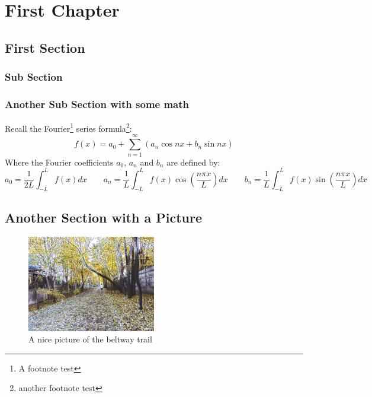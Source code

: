 \documentclass[11pt,letterpaper,twoside]{book}
\begin{document}
\tableofcontents

\chapter{First Chapter}

\lipsum[1-2]

\section{First Section}

\lipsum[3-5]

\subsection{Sub Section}

\lipsum[7-9]

\subsection{Another Sub Section with some math}

\lipsum[6-8]
Recall the Fourier\footnote{A footnote test} series formula\footnote{another footnote test \lipsum[1]}:
\[
f(x) = a_0 + \sum_{n = 1}^\infty \left( a_n \cos nx + b_n \sin nx \right)
\]
Where the Fourier coefficients $a_0$, $a_n$ and $b_n$ are defined by:
\[
a_0 = \frac{1}{2L} \int_{-L}^L f(x) dx  \qquad
a_n = \frac{1}{L}  \int_{-L}^L f(x) \cos \left( \frac{n\pi x}{L} \right) dx \qquad
b_n = \frac{1}{L}  \int_{-L}^L f(x) \sin \left( \frac{n\pi x}{L} \right) dx 
\]
\lipsum[33-34]

\section{Another Section with a Picture}

\lipsum[9]
\begin{figure}
\centering
\includegraphics[width=0.5\textwidth]{TrailPic1}
\caption{\label{fig:path}A nice picture of the beltway trail}
\end{figure}
\end{document}
